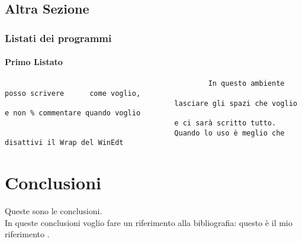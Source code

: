 \documentclass[12pt,a4paper,openright,twoside]{report}
\renewcommand{\chaptermark}[1]{\markboth{\thechapter.\ #1}{}}
\begin{document}
                                        \section{Altra Sezione}\label{sec:prova}%
                                        \subsection{Listati dei programmi}
                                        \subsubsection{Primo Listato}
                                        \begin{verbatim}
                                                In questo ambiente     posso scrivere      come voglio,
                                        lasciare gli spazi che voglio e non % commentare quando voglio
                                        e ci sarà scritto tutto.
                                        Quando lo uso è meglio che disattivi il Wrap del WinEdt
                                        \end{verbatim}
                                        \clearpage{\pagestyle{empty}\cleardoublepage}
                                        \chapter*{Conclusioni}
                                         Queste sono le
                                        conclusioni.\\
                                        In queste conclusioni voglio fare un riferimento alla
                                        bibliografia: questo \`e il mio riferimento \cite{K3,K4}.
                                        \renewcommand{\chaptermark}[1]{\markright{\thechapter \ #1}{}}
                                        \lhead[\fancyplain{}{\bfseries\thepage}]{\fancyplain{}{\bfseries\rightmark}}
                                        \appendix                               %
\end{document}

